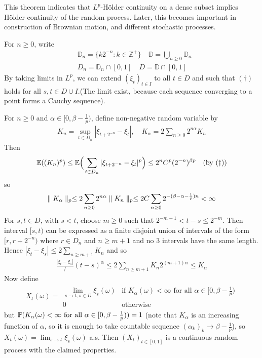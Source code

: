 \documentclass[10pt,a4paper]{report}
\newenvironment{proof}
{\begin{changemargin}{1cm}{0.5cm} 
	}%
	{\end{changemargin}
}
\begin{document}
This theorem indicates that $L^p$-H\"{o}lder continuity on a dense subset implies H\"{o}lder continuity of the random process. Later, this becomes important in construction of Brownian motion, and different stochastic processes.
\begin{proof}
\pf For $n \geq 0$, write
\begin{align*}
& \mathbb{D}_n = \{ k2^{-n}  : k \in \mathbb{Z}^+ \} \quad \mathbb{D}= \bigcup_{n\geq 0} \mathbb{D}_n \\
& D_n = \mathbb{D}_n \cap [0,1] \quad D = \mathbb{D} \cap [0,1]
\end{align*}
By taking limits in $L^p$, we can extend $(\xi_t)_{t\in I}$ to all $t\in D$ and such that $(\dagger)$ holds for all $s,t\in D\cup I$.(The limit exist, because each sequence converging to a point forms a Cauchy sequence).

\quad For $n \geq 0$ and $\alpha \in [0, \beta - \frac{1}{p})$, define non-negative random variable by
\begin{align*}
K_n = \sup_{t\in D_n} |\xi_{t+ 2^{-n}} - \xi_t|, \quad K_{\alpha} =2\sum_{n\geq 0} 2^{n\alpha} K_n
\end{align*}
Then
\begin{align*}
\mathbb{E}((K_n)^p) \leq \mathbb{E} \Big( \sum_{t\in D_n} |\xi_{t+{2^{-n}}} - \xi_t |^p \Big) \leq 2^n C^p (2^{-n})^{\beta p} \quad (\text{by } (\dagger))
\end{align*}
so
\begin{align*}
\parallel K_{\alpha} \parallel_{p} \leq 2 \sum_{n\geq 0} 2^{n\alpha} \parallel K_n \parallel_{p} \leq 2C \sum_{n\geq 0} 2^{-(\beta - \alpha - \frac{1}{p})n} < \infty
\end{align*}
For $s,t\in D$, with $s<t$, choose $m\geq 0$ such that $2^{-m-1} <t-s \leq 2^{-m}$. Then interval $[s,t)$ can be expressed as a finite disjoint union of intervals of the form $[r, r+ 2^{-n})$ where $r\in D_n$ and $n\geq m+1$ and no 3 intervals have the same length. Hence $|\xi_t - \xi_s | \leq 2\sum_{n\geq m+1} K_n$ and so 
\begin{align*}
\frac{|\xi_t - \xi_s|}/{(t-s)^{\alpha}} \leq 2\sum_{n\geq m+1} K_n 2^{(m+1)\alpha} \leq K_{\alpha}
\end{align*}
Now define
\begin{align*}
X_t(\omega) = \begin{array}{ll}
\lim_{s\rightarrow t, s\in D} \xi_s (\omega)  & \text{if } K_{\alpha}(\omega) < \infty \text{ for all } \alpha \in [0,\beta -\frac{1}{p}) \\
0 & \text{otherwise}
\end{array}
\end{align*}
but $\mathbb{P}(K_{\alpha}(\omega) < \infty \text{ for all } \alpha \in [0,\beta -\frac{1}{p})) =1$ (note that $K_{\alpha}$ is an increasing function of $\alpha$, so it is enough to take countable sequence $(\alpha_k)_k\rightarrow \beta -\frac{1}{p}$), so $X_t(\omega) = \lim_{s\rightarrow t}\xi_s(\omega)$ a.s. Then $(X_t)_{t\in [0,1]}$ is a continuous random process with the claimed properties.

\eop
\end{proof}
\s
\end{document}
